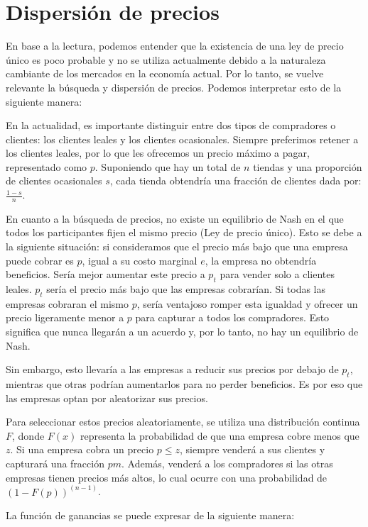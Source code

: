 \documentclass[11pt]{article}
\begin{document}
\section{Dispersión de precios}
\begin{flushleft}
    En base a la lectura, podemos entender que la existencia de una ley de precio único es poco probable y no se utiliza actualmente debido a la naturaleza cambiante de los mercados en la economía actual. Por lo tanto, se vuelve relevante la búsqueda y dispersión de precios. Podemos interpretar esto de la siguiente manera:

    En la actualidad, es importante distinguir entre dos tipos de compradores o clientes: los clientes leales y los clientes ocasionales. Siempre preferimos retener a los clientes leales, por lo que les ofrecemos un precio máximo a pagar, representado como $p$. Suponiendo que hay un total de $n$ tiendas y una proporción de clientes ocasionales $s$, cada tienda obtendría una fracción de clientes dada por: $\frac{{1-s}}{n}$.

    En cuanto a la búsqueda de precios, no existe un equilibrio de Nash en el que todos los participantes fijen el mismo precio (Ley de precio único). Esto se debe a la siguiente situación: si consideramos que el precio más bajo que una empresa puede cobrar es $p$, igual a su costo marginal $e$, la empresa no obtendría beneficios. Sería mejor aumentar este precio a $p_t$ para vender solo a clientes leales. $p_t$ sería el precio más bajo que las empresas cobrarían. Si todas las empresas cobraran el mismo $p$, sería ventajoso romper esta igualdad y ofrecer un precio ligeramente menor a $p$ para capturar a todos los compradores. Esto significa que nunca llegarán a un acuerdo y, por lo tanto, no hay un equilibrio de Nash.

    Sin embargo, esto llevaría a las empresas a reducir sus precios por debajo de $p_t$, mientras que otras podrían aumentarlos para no perder beneficios. Es por eso que las empresas optan por aleatorizar sus precios.

    Para seleccionar estos precios aleatoriamente, se utiliza una distribución continua $F$, donde $F(x)$ representa la probabilidad de que una empresa cobre menos que $z$. Si una empresa cobra un precio $p \leq z$, siempre venderá a sus clientes y capturará una fracción $pm$. Además, venderá a los compradores si las otras empresas tienen precios más altos, lo cual ocurre con una probabilidad de $(1 - F(p))^{(n-1)}$.

    La función de ganancias se puede expresar de la siguiente manera:


\end{flushleft}
\end{document}
